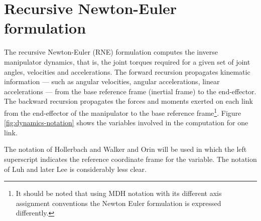 \documentclass{article}
\begin{document}
\section{Recursive Newton-Euler formulation}
The recursive Newton-Euler (RNE) formulation\cite{Luh80a}
computes the inverse manipulator dynamics, that is, the joint torques
required for a given set of joint angles, velocities and accelerations.
The forward recursion propagates kinematic information --- such as
angular velocities, angular accelerations, linear accelerations --- from the base
reference frame (inertial frame) to the end-effector.  The backward
recursion propagates the forces and moments exerted on each link from
the end-effector of the manipulator to the base reference frame\footnote{It 
should be noted that using MDH notation with its different
axis assignment conventions the Newton Euler formulation is expressed
differently\cite{Craig89}.}.
Figure \ref{fig:dynamics-notation} shows the variables involved in the
computation for one link.

The notation of Hollerbach\cite{Hollerbach80} and Walker and Orin
\cite{Walker82} will be used in
which the left superscript indicates the reference coordinate
frame for the variable.  The notation of Luh \etal\cite{Luh80a}
and later Lee\cite{Lee82a,Fu87} is considerably less clear.
\end{document}
